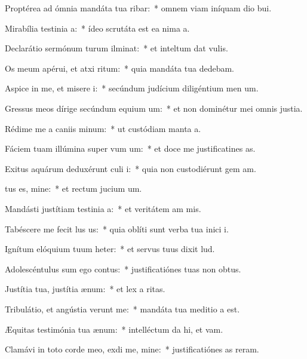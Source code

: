 \item Proptérea ad ómnia mandáta tua ribar:~* omnem viam iníquam dio bui.
\item Mirabília testinia a:~* ídeo scrutáta est ea nima a.
\item Declarátio sermónum turum ilminat:~* et inteltum dat vulis.
\item Os meum apérui, et atxi ritum:~* quia mandáta tua dedebam.
\item Aspice in me, et misere i:~* secúndum judícium diligéntium men um.
\item Gressus meos dírige secúndum equium um:~* et non dominétur mei omnis justia.
\item Rédime me a caniis minum:~* ut custódiam manta a.
\item Fáciem tuam illúmina super vum um:~* et doce me justificatines as.
\item Exitus aquárum deduxérunt culi i:~* quia non custodiérunt gem am.
\item {}tus es, mine:~* et rectum jucium um.
\item Mandásti justítiam testinia a:~* et veritátem am mis.
\item Tabéscere me fecit lus us:~* quia oblíti sunt verba tua inici i.
\item Ignítum elóquium tuum heter:~* et servus tuus dixit lud.
\item Adolescéntulus sum ego  contus:~* justificatiónes tuas non  obtus.
\item Justítia tua, justítia  ænum:~* et lex a ritas.
\item Tribulátio, et angústia verunt me:~* mandáta tua meditio a est.
\item Æquitas testimónia tua  ænum:~* intelléctum da hi, et vam.
\item Clamávi in toto corde meo, exdi me, mine:~* justificatiónes as reram.
